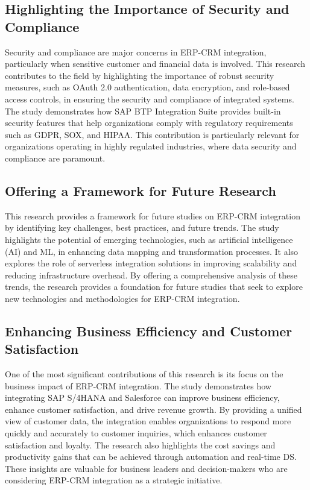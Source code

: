 \subsection{Highlighting the Importance of Security and Compliance}
Security and compliance are major concerns in ERP-CRM integration, particularly when sensitive customer and financial data is involved. This research contributes to the field by highlighting the importance of robust security measures, such as OAuth 2.0 authentication, data encryption, and role-based access controls, in ensuring the security and compliance of integrated systems. The study demonstrates how SAP BTP Integration Suite provides built-in security features that help organizations comply with regulatory requirements such as GDPR, SOX, and HIPAA. This contribution is particularly relevant for organizations operating in highly regulated industries, where data security and compliance are paramount.

\subsection{ Offering a Framework for Future Research}
This research provides a framework for future studies on ERP-CRM integration by identifying key challenges, best practices, and future trends. The study highlights the potential of emerging technologies, such as artificial intelligence (AI) and ML, in enhancing data mapping and transformation processes. It also explores the role of serverless integration solutions in improving scalability and reducing infrastructure overhead. By offering a comprehensive analysis of these trends, the research provides a foundation for future studies that seek to explore new technologies and methodologies for ERP-CRM integration.

\subsection{Enhancing Business Efficiency and Customer Satisfaction}
One of the most significant contributions of this research is its focus on the business impact of ERP-CRM integration. The study demonstrates how integrating SAP S/4HANA and Salesforce can improve business efficiency, enhance customer satisfaction, and drive revenue growth. By providing a unified view of customer data, the integration enables organizations to respond more quickly and accurately to customer inquiries, which enhances customer satisfaction and loyalty. The research also highlights the cost savings and productivity gains that can be achieved through automation and real-time DS. These insights are valuable for business leaders and decision-makers who are considering ERP-CRM integration as a strategic initiative.

